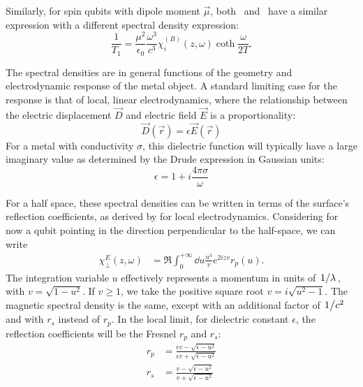 \documentclass{article}
\begin{document}
Similarly, for spin qubits with dipole moment $\vec{\mu}$, both~\cite{QubitRelax} and~\cite{Henkel1999} have a similar expression with a different spectral density expression:
\begin{equation}
	\frac{1}{T_1} = \frac{\mu^2}{\epsilon_0} \frac{\omega^3}{c^3} \chi_{i}^{(B)}(z, \omega) \coth\frac{\omega}{2 T}.
\end{equation}

The spectral densities are in general functions of the geometry and electrodynamic response of the metal object.
A standard limiting case for the response is that of local, linear electrodynamics, where the relationship between the electric displacement $\vec{D}$ and electric field $\vec{E}$ is a proportionality:
\begin{equation}
	\vec{D}(\vec{r}) = \epsilon \vec{E}(\vec{r})
\end{equation}
For a metal with conductivity $\sigma$, this dielectric function will typically have a large imaginary value as determined by the Drude expression in Gaussian units:
\begin{equation}
	\epsilon = 1 + i\frac{4 \pi \sigma}{\omega}
\end{equation}

For a half space, these spectral densities can be written in terms of the surface's reflection coefficients, as derived by\cite{Henkel1999} for local electrodynamics.
Considering for now a qubit pointing in the direction perpendicular to the half-space, we can write
\begin{align}
	\chi_\perp^E(z, \omega) &= \Re \int_0^{+\infty} \dd{u} \frac{u^3}{v} e^{2 i z v} r_p(u). \label{eq:chi}
\end{align}
The integration variable $u$ effectively represents a momentum in units of $\flatfrac{1}{\lambda}$, with $v = \sqrt{1 - u^2}$.
If $v \geq 1$, we take the positive square root $v = i \sqrt{u^2 - 1}$.
The magnetic spectral density is the same, except with an additional factor of $\flatfrac{1}{c^2}$ and with $r_s$ instead of $r_p$.
In the local limit, for dielectric constant $\epsilon$, the reflection coefficients will be the Fresnel $r_p$ and $r_s$:
\begin{align}
	r_p &= \frac{\epsilon v - \sqrt{\epsilon - u^2}}{\epsilon v + \sqrt{\epsilon - u^2}} \\
	r_s &= \frac{v - \sqrt{\epsilon - u^2}}{ v + \sqrt{\epsilon - u^2}}
\end{align}
\end{document}
